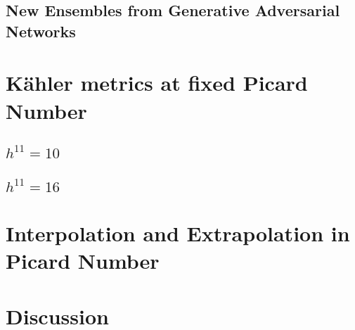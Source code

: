 \documentclass[12pt,a4paper]{article}
\begin{document}
\subsection{New Ensembles from Generative Adversarial Networks}

\section{K\" ahler metrics at fixed Picard Number}

\subsection{$h^{11} = 10$}
\subsection{$h^{11} = 16$}

\section{Interpolation and Extrapolation in Picard Number}

\section{Discussion}

\clearpage 
\end{document}
